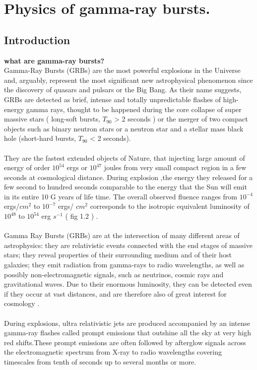 \setcounter{chapter}{0}
\chapter{Physics of gamma-ray bursts.}
\section{Introduction}
\textbf{what are gamma-ray bursts?}\\
Gamma-Ray Bursts (GRBs) are the most powerful explosions in the Universe and, arguably, represent the most significant new astrophysical phenomenon since the discovery of quasars and pulsars or the Big Bang. As their name suggests, GRBs are detected as brief, intense and totally unpredictable flashes of high-energy gamma rays, thought to be happened during the core collapse of super massive stars ( long-soft bursts, $T _{90}$ > 2 seconds ) or the merger of two compact objects such as binary neutron stars or a neutron star and a stellar mass black hole (short-hard bursts, $T _{90}$ < 2 seconds).\citep{1}\\\\ 
They are the fastest extended objects of Nature, that injecting large amount of energy of order $10^{54}$ ergs or $ 10^{47} $ joules from very small compact region in a few seconds at cosmological distance. During explosion ,the energy they released for a few second to hundred seconds comparable to the energy that  the Sun will emit in its entire 10 G years of life time. The overall observed fluence ranges from $10^{-4} $ ergs/$ cm^{2}$ to $ 10^{-7} $ ergs/ $ cm^{2} $  corresponds to the isotropic equivalent luminosity of $ 10^{48} $  to  $10^{54} $ erg $ s^{-1} $ ( fig 1.2 ) \citep{1,2}.\\\\
Gamma Ray Bursts (GRBs) are at the intersection of many different areas of astrophysics: they are relativistic events connected with the end stages of massive stars; they reveal properties of their surrounding medium and of their host galaxies; they emit radiation from gamma-rays to radio wavelengths, as well as possibly non-electromagnetic signals, such as neutrinos, cosmic rays and gravitational waves. Due to their enormous luminosity, they can be detected even if they occur at vast distances, and are therefore also of great interest for cosmology \citep{2}.\\\\
 During  explosions, ultra relativistic jets are produced accompanied by an intense gamma-ray flashes called prompt emissions that outshine all the sky at very high red shifts.These prompt emissions are often followed by afterglow signals across the electromagnetic spectrum from X-ray to radio wavelengths covering timescales from tenth of seconds up to several months or more. \citep{2,3}\\\\
